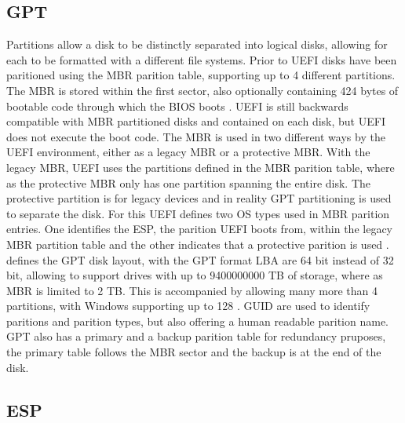 \subsection{\acf{GPT}}

Partitions allow a disk to be distinctly separated into logical disks, allowing for each to be formatted with a different file systems.
Prior to \ac{UEFI} disks have been paritioned using the \ac{MBR} parition table, supporting up to 4 different partitions.
The \ac{MBR} is stored within the first sector, also optionally containing 424 bytes of bootable code through which the \ac{BIOS} boots \cite[Section 13.3.1]{uefi-spec}.
\ac{UEFI} is still backwards compatible with \ac{MBR} partitioned disks and contained on each disk, but \ac{UEFI} does not execute the boot code.
The \ac{MBR} is used in two different ways by the \ac{UEFI} environment, either as a legacy \ac{MBR} or a protective \ac{MBR}.
With the legacy \ac{MBR}, \ac{UEFI} uses the partitions defined in the \ac{MBR} parition table, where as the protective \ac{MBR} only has one partition spanning the entire disk.
The protective partition is for legacy devices and in reality \ac{GPT} partitioning is used to separate the disk.
For this \ac{UEFI} defines two \ac{OS} types used in \ac{MBR} parition entries.
One identifies the \ac{ESP}, the parition \ac{UEFI} boots from, within the legacy \ac{MBR} partition table and the other indicates that a protective parition is used \cite[Section 5]{uefi-spec}.
\cite[Section 5]{uefi-spec} defines the \ac{GPT} disk layout, with the \ac{GPT} format \ac{LBA} are 64 bit instead of 32 bit, allowing to support drives with up to 9400000000 \ac{TB} of storage, where as \ac{MBR} is limited to 2 \ac{TB}.
This is accompanied by allowing many more than 4 partitions, with Windows supporting up to 128 \cite{microsoft-windows-and-gpt-faq}.
\ac{GUID} are used to identify paritions and parition types, but also offering a human readable parition name.
\ac{GPT} also has a primary and a backup parition table for redundancy pruposes, the primary table follows the \ac{MBR} sector and the backup is at the end of the disk.

\subsection{\acf{ESP}}

